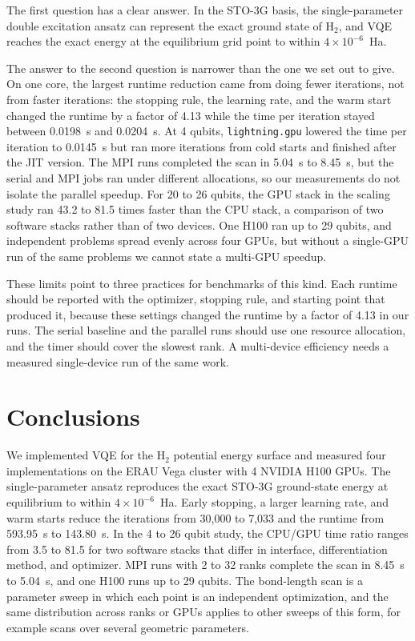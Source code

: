 \documentclass[11pt]{article}
\begin{document}
The first question has a clear answer. In the STO-3G basis, the single-parameter double excitation ansatz can represent the exact ground state of H$_2$, and VQE reaches the exact energy at the equilibrium grid point to within $4\times10^{-6}$~Ha.

The answer to the second question is narrower than the one we set out to give. On one core, the largest runtime reduction came from doing fewer iterations, not from faster iterations: the stopping rule, the learning rate, and the warm start changed the runtime by a factor of 4.13 while the time per iteration stayed between 0.0198~s and 0.0204~s. At 4 qubits, \texttt{lightning.gpu} lowered the time per iteration to 0.0145~s but ran more iterations from cold starts and finished after the JIT version. The MPI runs completed the scan in 5.04~s to 8.45~s, but the serial and MPI jobs ran under different allocations, so our measurements do not isolate the parallel speedup. For 20 to 26 qubits, the GPU stack in the scaling study ran 43.2 to 81.5 times faster than the CPU stack, a comparison of two software stacks rather than of two devices. One H100 ran up to 29 qubits, and independent problems spread evenly across four GPUs, but without a single-GPU run of the same problems we cannot state a multi-GPU speedup.

These limits point to three practices for benchmarks of this kind. Each runtime should be reported with the optimizer, stopping rule, and starting point that produced it, because these settings changed the runtime by a factor of 4.13 in our runs. The serial baseline and the parallel runs should use one resource allocation, and the timer should cover the slowest rank. A multi-device efficiency needs a measured single-device run of the same work.

\section{Conclusions}

We implemented VQE for the H$_2$ potential energy surface and measured four implementations on the ERAU Vega cluster with 4 NVIDIA H100 GPUs. The single-parameter ansatz reproduces the exact STO-3G ground-state energy at equilibrium to within $4\times10^{-6}$~Ha. Early stopping, a larger learning rate, and warm starts reduce the iterations from 30,000 to 7,033 and the runtime from 593.95~s to 143.80~s. In the 4 to 26 qubit study, the CPU/GPU time ratio ranges from 3.5 to 81.5 for two software stacks that differ in interface, differentiation method, and optimizer. MPI runs with 2 to 32 ranks complete the scan in 8.45~s to 5.04~s, and one H100 runs up to 29 qubits. The bond-length scan is a parameter sweep in which each point is an independent optimization, and the same distribution across ranks or GPUs applies to other sweeps of this form, for example scans over several geometric parameters.
\end{document}
